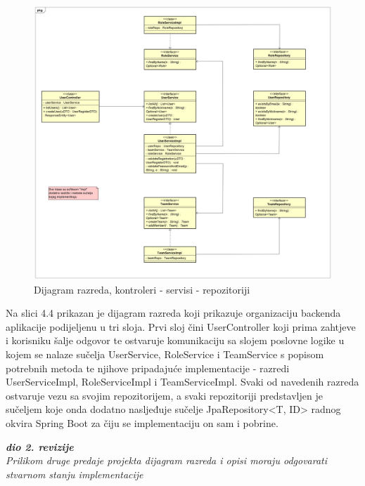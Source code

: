 			\begin{figure}[H]
				\includegraphics[width=\textwidth]{dijagrami/classDiagram2.PNG} 
				\caption{Dijagram razreda, kontroleri - servisi - repozitoriji}
				\label{fig:classDiagram2}
			\end{figure}
		
			Na slici 4.4 prikazan je dijagram razreda koji prikazuje organizaciju backenda aplikacije podijeljenu u tri sloja. Prvi sloj čini UserController koji prima zahtjeve i korisniku šalje odgovor te ostvaruje komunikaciju sa slojem poslovne logike u kojem se nalaze sučelja UserService, RoleService i TeamService s popisom potrebnih metoda te njihove pripadajuće implementacije - razredi UserServiceImpl, RoleServiceImpl i TeamServiceImpl. Svaki od navedenih razreda ostvaruje vezu sa svojim repozitorijem, a svaki repozitoriji predstavljen je sučeljem koje onda dodatno nasljeđuje sučelje JpaRepository\textless T, ID\textgreater{} radnog okvira Spring Boot za čiju se implementaciju on sam i pobrine.
			\newline\newline
	
			\textbf{\textit{dio 2. revizije}}\\			
			
			\textit{Prilikom druge predaje projekta dijagram razreda i opisi moraju odgovarati stvarnom stanju implementacije}
			
	
			
